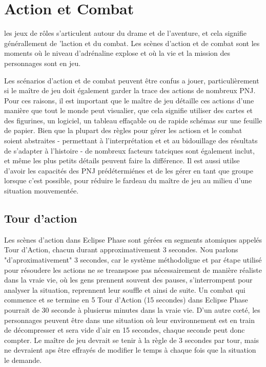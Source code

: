 \chapter{Action et Combat} \label{chap:action-combat} 

les jeux de rôles s'articulent autour du drame et de l'aventure, et cela signifie générallement de 'laction et du combat. Les scènes d'action et de combat sont les moments où le niveau d'adrénaline explose et où la vie et la mission des personnages sont en jeu. 

Les scénarios d'action et de combat peuvent être confus a  jouer, particulièrement si le maître de jeu doit également garder la trace des actions de nombreux PNJ. Pour ces raisons, il est important que le maître de jeu détaille ces actions d'une manière que tout le monde peut visualier, que cela signifie utiliser des cartes et des figurines, un logiciel, un tableau effaçable ou de rapide schémas sur une feuille de papier. Bien que la plupart des règles pour gérer les actiosn et le combat soient abstraites - permettant à l'interprétation et et au bidouillage des résultats de s'adapter à l'histoire - de nombreux facteurs tatciques sont également inclut, et même les plus petits détails peuvent faire la différence. Il est aussi utilse d'avoir les capacités des PNJ prédétermiénes et de les gérer en tant que groupe lorsque c'est possible, pour réduire le fardeau du maître de jeu au milieu d'une situation mouvementée. 

\section{Tour d'action} \label{sec:combat-action-turns} 

Les scènes d'action dans Eclipse Phase sont gérées en segments atomiques appelés Tour d'Action, chacun durant approximativement 3 secondes. Nou parlons "d'aproximativement" 3 secondes, car le système méthodoligue et par étape utilisé pour résoudere les actions ne se treanspose pas nécessairement de manière réaliste dans la vraie vie, où les gens prennent souvent des pauses, s'interrompent pour analyser la situation, reprennent leur souffle et ainsi de suite. Un combat qui commence et se termine en 5 Tour d'Action (15 secondes) dans Eclipse Phase pourrait de 30 seconde à plusierus minutes dans la vraie vie. D'un autre cœté, les personnages peuvent être dans une situation où leur environnement est en train de décompresser et sera vide d'air en 15 secondes, chaque seconde peut donc compter. Le maître de jeu devrait se tenir à la règle de 3 secondes par tour, mais ne devraient aps être effrayés de modifier le temps à chaque fois que la situation le demande. 

